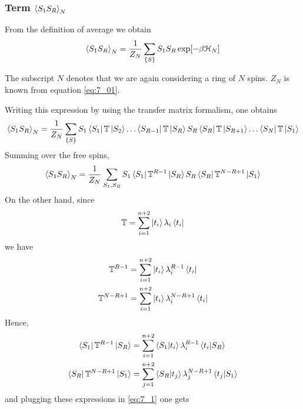 \documentclass[../main/main.tex]{subfiles}
\begin{document}
\subsubsection{Term \(\expval{S_1 S_R}_N\)}
\noindent From the definition of average we obtain
\begin{equation}
  \expval{S_1 S_R}_N = \frac{1}{Z_N} \sum_{\{ S \}  }^{} S_1 S_R \exp [-\beta \mathcal{H}_N]
\end{equation}
\begin{remark}
The subscript \( N \) denotes that we are again considering a ring of \( N \) spins. \( Z_N \) is known from equation \eqref{eq:7_01}.
\end{remark}
Writing this expression by using the transfer matrix formalism, one obtains
\begin{equation*}
\expval{S_1 S_R}_N  = \frac{1}{Z_N} \sum_{\{ S \}  }^{} S_1 \bra{S_1} \mathbb{T} \ket{S_2} \dots  \bra{S_{R-1}} \mathbb{T} \ket{S_R} S_R \bra{S_R} \mathbb{T} \ket{S_{R+1}} \dots \bra{S_N} \mathbb{T} \ket{S_1}
\end{equation*}
Summing over the free spins,
\begin{equation}
  \expval{S_1 S_R}_N = \frac{1}{Z_N} \sum_{S_1,S_R}^{} S_1 \bra{S_1} \mathbb{T}^{R-1} \ket{S_R} S_R \bra{S_R} \mathbb{T}^{N-R+1} \ket{S_1}
  \label{eq:7_1}
\end{equation}
On the other hand, since
\begin{equation*}
  \mathbb{T} = \sum_{i=1}^{n+2} \ket{t_i} \lambda _i  \bra{t_i}
\end{equation*}
we have
\begin{subequations}
\begin{align}
  \mathbb{T}^{R-1} &= \sum_{i=1}^{n+2} \ket{t_i} \lambda _i^{R-1}  \bra{t_i} \\
    \mathbb{T}^{N-R+1} &= \sum_{i=1}^{n+2} \ket{t_i} \lambda _i^{N-R+1}  \bra{t_i}
\end{align}
\end{subequations}
Hence,
\begin{subequations}
\begin{align}
  \bra{S_1} \mathbb{T}^{R-1} \ket{S_R} & = \sum_{i=1}^{n+2} \braket{S_1}{t_i} \lambda_i ^{R-1} \braket{t_i}{S_R} \\
  \bra{S_R} \mathbb{T}^{N-R+1} \ket{S_1} & = \sum_{j=1}^{n+2} \braket{S_R}{t_j} \lambda_j ^{N-R+1} \braket{t_j}{S_1}   
\end{align}
\end{subequations}
and plugging these expressions in  \eqref{eq:7_1} one gets
\end{document}
